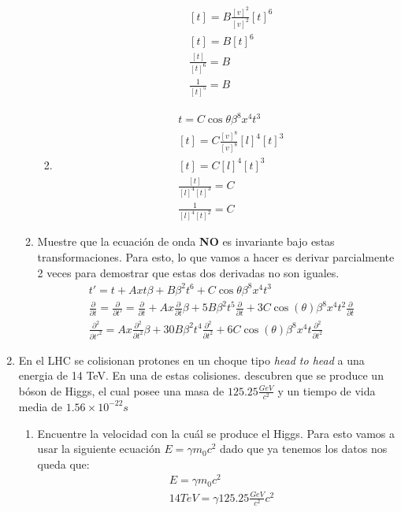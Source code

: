 \documentclass[12pt]{exam}
\begin{document}
\begin{enumerate}
\begin{enumerate}
\begin{enumerate}
\begin{align*}
					& [t] = B\frac{[v]^2}{[v]^2}[t]^6\\
					& [t] = B[t]^6\\
					& \frac{[t]}{[t]^6} = B\\
					& \frac{1}{[t]^5} = B
			\end{align*}
			\item \begin{align*}
					& t = C\cos\theta\beta^8x^4t^3\\
					& [t] = C\frac{[v]^8}{[v]^8}[l]^4[t]^3\\
					& [t] = C[l]^4[t]^3\\
					& \frac{[t]}{[l]^4[t]^3} = C\\
					& \frac{1}{[l]^4[t]^2} = C
			\end{align*}
				\end{enumerate}
			\item Muestre que la ecuación de onda \textbf{NO} es invariante bajo estas transformaciones.
				Para esto, lo que vamos a hacer es derivar parcialmente 2 veces para demostrar que estas dos derivadas no son iguales.
				\begin{align*}
					& t' = t + Axt\beta + B\beta^2t^6 + C\cos\theta\beta^8x^4t^3\\
					& \frac{\partial}{\partial t} = \frac{\partial}{\partial t'} = \frac{\partial}{\partial t} + Ax\frac{\partial}{\partial t}\beta + 5B\beta^2t^5\frac{\partial}{\partial t} + 3C\cos(\theta)\beta^8x^4t^2\frac{\partial}{\partial t}\\
					& \frac{\partial^2}{\partial t'^2} = Ax\frac{\partial^2}{\partial t^2}\beta + 30B\beta^2t^4\frac{\partial^2}{\partial t^2} +  6C\cos(\theta)\beta^8x^4t\frac{\partial^2}{\partial t^2}
				\end{align*}
		\end{enumerate}
	\item En el LHC se colisionan protones en un choque tipo \textit{head to head} a una energia de 14 TeV. En una de estas colisiones. descubren que se produce un bóson de Higgs, el cual posee una masa de $125.25\frac{GeV}{c^2}$ y un tiempo de vida media de $1.56\times 10^{-22}s$
		\begin{enumerate}
			\item Encuentre la velocidad con la cuál se produce el Higgs.
				Para esto vamos a usar la siguiente ecuación $E = \gamma m_0c^2$  dado que ya tenemos los datos nos queda que:
				\begin{align*}
					& E = \gamma m_0 c^2\\
					& 14 TeV = \gamma 125.25 \frac{GeV}{c^2}c^2\\

\end{align*}
\end{enumerate}
\end{enumerate}
\end{document}
